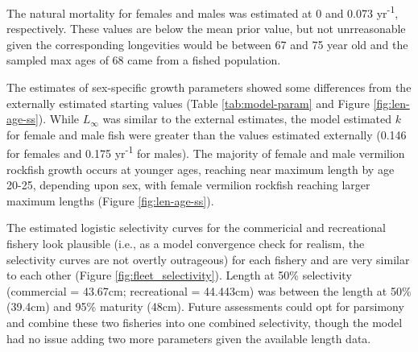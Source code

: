 \documentclass[11pt,
  english,
  a4paper,
]{article}
\begin{document}
\leavevmode\tagmcend\tagstructend\par


The natural mortality for females and males was estimated at 0 and 0.073 yr\textsuperscript{-1}, respectively. These values are below the mean prior value, but not unrreasonable given the corresponding longevities would be between 67 and 75 year old and the sampled max ages of 68 came from a fished population.

\leavevmode\tagmcend\tagstructend\par


The estimates of sex-specific growth parameters showed some differences from the externally estimated starting values (Table \ref{tab:model-param} and Figure \ref{fig:len-age-ss}). While {\(L_{\infty}\)\leavevmode\tagmcend\tagstructend} was similar to the external estimates, the model estimated {\(k\)\leavevmode\tagmcend\tagstructend} for female and male fish were greater than the values estimated externally (0.146 for females and 0.175 yr\textsuperscript{-1} for males). The majority of female and male vermilion rockfish growth occurs at younger ages, reaching near maximum length by age 20-25, depending upon sex, with female vermilion rockfish reaching larger maximum lengths (Figure \ref{fig:len-age-ss}).

\leavevmode\tagmcend\tagstructend\par


The estimated logistic selectivity curves for the commericial and recreational fishery look plausible (i.e., as a model convergence check for realism, the selectivity curves are not overtly outrageous) for each fishery and are very similar to each other (Figure \ref{fig:fleet_selectivity}). Length at 50\% selectivity (commercial = 43.67cm; recreational = 44.443cm) was between the length at 50\% (39.4cm) and 95\% maturity (48cm). Future assessments could opt for parsimony and combine these two fisheries into one combined selectivity, though the model had no issue adding two more parameters given the available length data.

\leavevmode\tagmcend\tagstructend\par
\end{document}
